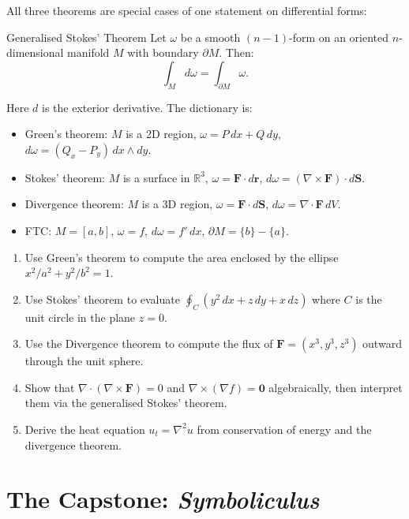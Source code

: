 \documentclass[12pt, openany]{book}
\theoremstyle{plain}
\theoremstyle{definition}
\theoremstyle{remark}
\newcommand{\R}{\mathbb{R}}
\begin{document}
All three theorems are special cases of one statement on differential forms:

\begin{thmbox}{Generalised Stokes' Theorem}
Let $\omega$ be a smooth $(n-1)$-form on an oriented $n$-dimensional manifold $M$
with boundary $\partial M$.  Then:
\[\int_M d\omega = \int_{\partial M} \omega.\]
\end{thmbox}
\color{black}

Here $d$ is the exterior derivative.  The dictionary is:
\begin{itemize}[noitemsep]
  \item Green's theorem: $M$ is a 2D region, $\omega=P\,dx+Q\,dy$,
        $d\omega=(Q_x-P_y)\,dx\wedge dy$.
  \item Stokes' theorem: $M$ is a surface in $\R^3$, $\omega=\mathbf{F}\cdot d\mathbf{r}$,
        $d\omega=(\nabla\times\mathbf{F})\cdot d\mathbf{S}$.
  \item Divergence theorem: $M$ is a 3D region, $\omega=\mathbf{F}\cdot d\mathbf{S}$,
        $d\omega=\nabla\cdot\mathbf{F}\,dV$.
  \item FTC: $M=[a,b]$, $\omega=f$, $d\omega=f'\,dx$,
        $\partial M=\{b\}-\{a\}$.
\end{itemize}

\begin{exbox}
\begin{enumerate}
  \item Use Green's theorem to compute the area enclosed by the ellipse $x^2/a^2+y^2/b^2=1$.
  \item Use Stokes' theorem to evaluate
        $\oint_C (y^2\,dx+z\,dy+x\,dz)$ where $C$ is the unit circle in the plane $z=0$.
  \item Use the Divergence theorem to compute the flux of
        $\mathbf{F}=(x^3,y^3,z^3)$ outward through the unit sphere.
  \item Show that $\nabla\cdot(\nabla\times\mathbf{F})=0$ and
        $\nabla\times(\nabla f)=\mathbf{0}$ algebraically, then interpret them via
        the generalised Stokes' theorem.
  \item Derive the heat equation $u_t=\nabla^2 u$ from conservation of energy and
        the divergence theorem.
\end{enumerate}
\end{exbox}
\color{black}

\part{The Capstone: \textit{Symboliculus}}
\color{black}
\end{document}
